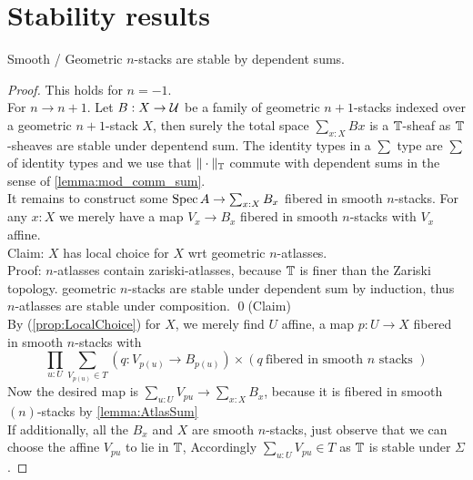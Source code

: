 \documentclass{article}
\newcommand{\red}[1]{{\color{red} #1}}
\begin{document}
\section{Stability results}
\begin{theorem}{\label{thM:stabSums}}
    Smooth / Geometric $n$-stacks are stable by dependent sums.
\end{theorem}
\begin{proof}
    This holds for $n = -1$. \\
    For $n \to n+1$. Let $B : X \to \mathcal{U}$ be a family of geometric $n+1$-stacks indexed over a geometric $n+1$-stack $X$, then surely the total space $\sum_{x : X} B x$ is a $\mathbb{T}$-sheaf as $\mathbb{T}$-sheaves are stable under depentend sum. 
    The identity types in a $\sum$ type are $\sum$ of identity types \red{and we use that $\|\cdot\|_{\mathbb{T}}$  commute with dependent sums in the sense of \ref{lemma:mod_comm_sum}.}
    \\ %
    It remains to construct some $\operatorname{Spec} A \to \sum_{x : X} B_x$ fibered in smooth $n$-stacks.
    For any $x : X$ we merely have a map $V_x \to B_x$ fibered in smooth $n$-stacks with $V_x$ affine. \\
    Claim: $X$ has local choice for $X$ wrt geometric $n$-atlasses.\\
    Proof:
        $n$-atlasses contain zariski-atlasses, because $\mathbb{T}$ is finer than the Zariski topology.
        geometric $n$-stacks are stable under dependent sum by induction, thus $n$-atlasses are stable under composition.         
    \qed(Claim)\\
    By (\ref{prop:LocalChoice}) for $X$, we merely find $U$ affine, a map $p : U \to X$ fibered in smooth $n$-stacks with
    \[
    \prod_{u : U} \sum_{V_{p(u)} \in T} (q : V_{p(u)} \to B_{p(u)}) \times (q \ \text{fibered in smooth } n \text{ stacks } )
    \]
    Now the desired map is $\sum_{u : U} V_{p u} \to \sum_{x : X} B_x$, because it is fibered in smooth $(n)$-stacks by \ref{lemma:AtlasSum} \\
    If additionally, all the $B_x$ and $X$ are smooth $n$-stacks, just observe that we can choose the affine $V_{p u}$ to lie in $\mathbb{T}$, Accordingly $\sum_{u : U} V_{p u} \in T$ as $\mathbb{T}$ is stable under $\Sigma$.
    
\end{proof}
\end{document}
